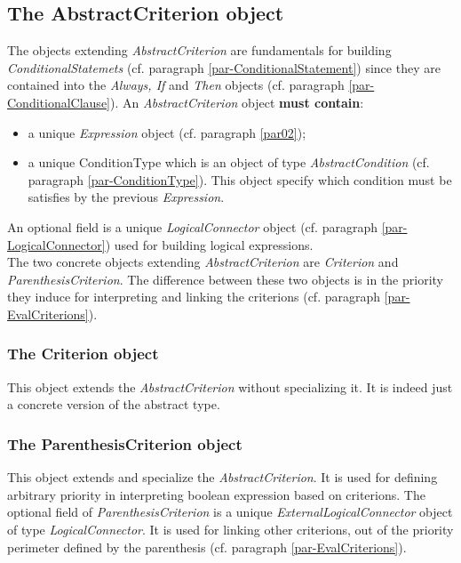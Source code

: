 \documentclass[a4paper,11pt] {article}
\begin{document}
\subsection{The AbstractCriterion object}\label{par-AbstractCriterion}
The objects extending {\it AbstractCriterion} are fundamentals for building {\it ConditionalStatemets} (cf. paragraph \ref{par-ConditionalStatement}) since they are contained into the {\it Always, If} and {\it Then} objects (cf. paragraph \ref{par-ConditionalClause}).
An {\it AbstractCriterion} object {\bf must contain}:
\begin{itemize}
\item a unique {\it Expression} object (cf. paragraph \ref{par02});
\item a unique ConditionType which is an object of type {\it AbstractCondition} (cf. paragraph  \ref{par-ConditionType}).
This object specify which condition must be satisfies by the previous {\it Expression}.
\end{itemize}
An optional field is a unique {\it LogicalConnector} object (cf. paragraph \ref{par-LogicalConnector}) used for building logical expressions.\\
The two concrete objects extending  {\it AbstractCriterion}  are {\it Criterion} and {\it ParenthesisCriterion}.  The difference between these two objects is in the priority they induce for interpreting and linking the criterions (cf. paragraph \ref{par-EvalCriterions}).

\subsubsection{The Criterion object}
This object extends the  {\it AbstractCriterion} without specializing it. It is indeed just a concrete version of the abstract type.

\subsubsection{The ParenthesisCriterion object}
This object extends and specialize the  {\it AbstractCriterion}. It is used for defining arbitrary priority in interpreting boolean expression based on criterions.
The optional field of {\it ParenthesisCriterion} is a unique {\it ExternalLogicalConnector} object of type {\it LogicalConnector}. It is used for linking other criterions, out of the priority perimeter defined by the parenthesis (cf.  paragraph \ref{par-EvalCriterions}).
\end{document}
